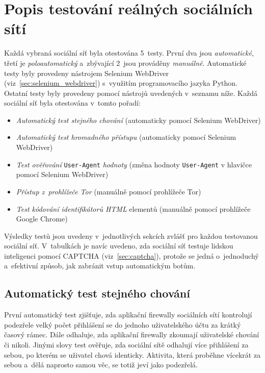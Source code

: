 \section{Popis testování reálných sociálních sítí}
Každá vybraná sociální síť byla otestována 5~testy. První dva jsou \textit{automatické}, třetí je \textit{poloautomatický} a~zbývající 2~jsou prováděny \textit{manuálně}. Automatické testy byly provedeny nástrojem Selenium WebDriver (viz~\ref{sec:selenium_webdriver}) s~využitím programovacího jazyka Python. Ostatní testy byly provedeny pomocí nástrojů uvedených v~seznamu níže. Každá sociální síť byla otestována v~tomto pořadí: 
\begin{itemize}
  \item \textit{Automatický test stejného chování} (automaticky pomocí Selenium WebDriver)
  \item \textit{Automatický test hromadného přístupu} (automaticky pomocí Selenium WebDriver)
  \item \textit{Test ověřování} \texttt{User-Agent} \textit{hodnoty} (změna hodnoty \texttt{User-Agent} v hlavičce pomocí Selenium WebDriver)
  \item \textit{Přístup z~prohlížeče Tor} (manuálně pomocí prohlížeče Tor)
  \item \textit{Test kódování identifikátorů HTML} elementů (manuálně pomocí prohlížeče Google Chrome)
\end{itemize}

\noindent
Výsledky testů jsou uvedeny v~jednotlivých sekcích zvlášť pro každou testovanou sociální síť. V~tabulkách je navíc uvedeno, zda sociální síť testuje lidskou inteligenci pomocí CAPTCHA (viz~\ref{sec:captcha}), protože se jedná o~jednoduchý a~efektivní způsob, jak zabránit vstup automatickým botům.

\subsection*{Automatický test stejného chování}
\label{sec:repeated_behaviour}
První automatický test zjišťuje, zda aplikační firewally sociálních sítí kontrolují podezřele velký počet přihlášení se do jednoho uživatelského účtu za krátký časový rámec. Dále odhaluje, zda aplikační firewally zkoumají uživatelské chování či nikoli. Jinými slovy test ověřuje, zda sociální sítě odhalují více přihlášení za sebou, po kterém se uživatel chová identicky. Aktivita, která proběhne vícekrát za sebou a~dělá naprosto samou věc, se totiž jeví jako podezřelá.

